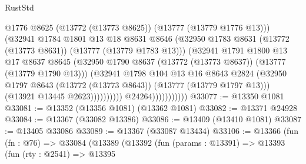 \begin{lexlean}{RustStd}
\begin{coremodule}
                                        @1776
                                        @8625
                                        (@13772 (@13773 @8625))
                                        (@13777 (@13779 @1776 @13)))
                                      (@32941
                                        @1784
                                        @1801
                                        @13
                                        @18
                                        @8631
                                        @8646
                                        (@32950
                                          @1783
                                          @8631
                                          (@13772 (@13773 @8631))
                                          (@13777 (@13779 @1783 @13)))
                                        (@32941
                                          @1791
                                          @1800
                                          @13
                                          @17
                                          @8637
                                          @8645
                                          (@32950
                                            @1790
                                            @8637
                                            (@13772 (@13773 @8637))
                                            (@13777 (@13779 @1790 @13)))
                                          (@32941
                                            @1798
                                            @104
                                            @13
                                            @16
                                            @8643
                                            @2824
                                            (@32950
                                              @1797
                                              @8643
                                              (@13772 (@13773 @8643))
                                              (@13777 (@13779 @1797 @13)))
                                            (@13921 @13445 @2623))))))))))
                          @24264)))))))))))
@33077 := @13350 @1081
@33081 := @13352 (@13356 @1081) (@13362 @1081)
@33082 := @13371 @24928
@33084 := @13367 (@33082 @13386)
@33086 := @13409 (@13410 @1081)
@33087 := @13405 @33086
@33089 := @13367 (@33087 @13434)
@33106 := @13366
    (fun (fn : @76) =>
    @33084
      (@13389
        (@13392
          (fun (params : @13391) =>
          @13393
            (fun (rty : @2541) =>
            @13395

\end{coremodule}
\end{lexlean}
